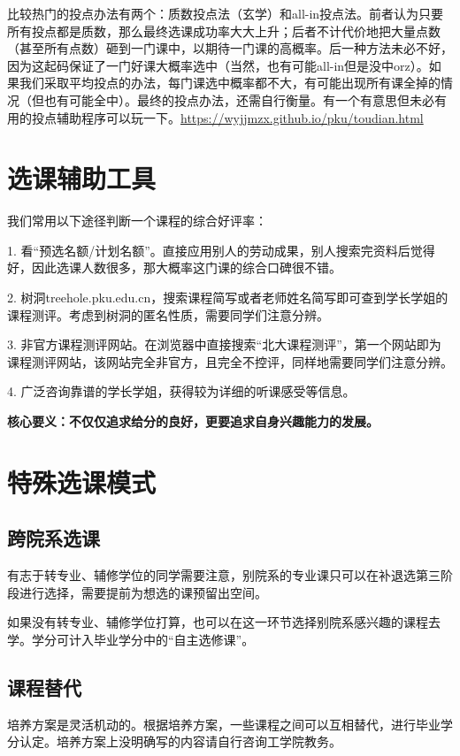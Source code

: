 \documentclass[11pt,oneside]{book}
\begin{document}
比较热门的投点办法有两个：质数投点法（玄学）和all-in投点法。前者认为只要所有投点都是质数，那么最终选课成功率大大上升；后者不计代价地把大量点数（甚至所有点数）砸到一门课中，以期待一门课的高概率。后一种方法未必不好，因为这起码保证了一门好课大概率选中（当然，也有可能all-in但是没中orz）。如果我们采取平均投点的办法，每门课选中概率都不大，有可能出现所有课全掉的情况（但也有可能全中）。最终的投点办法，还需自行衡量。有一个有意思但未必有用的投点辅助程序可以玩一下。\href{https://wyjjmzx.github.io/pku/toudian.html}{https://wyjjmzx.github.io/pku/toudian.html}


\section{选课辅助工具}
我们常用以下途径判断一个课程的综合好评率：

1. 看“预选名额/计划名额”。直接应用别人的劳动成果，别人搜索完资料后觉得好，因此选课人数很多，那大概率这门课的综合口碑很不错。

2. 树洞treehole.pku.edu.cn，搜索课程简写或者老师姓名简写即可查到学长学姐的课程测评。考虑到树洞的匿名性质，需要同学们注意分辨。

3. 非官方课程测评网站。在浏览器中直接搜索“北大课程测评”，第一个网站即为课程测评网站，该网站完全非官方，且完全不控评，同样地需要同学们注意分辨。

4. 广泛咨询靠谱的学长学姐，获得较为详细的听课感受等信息。

\textbf{核心要义：不仅仅追求给分的良好，更要追求自身兴趣能力的发展。}

\section{特殊选课模式}
\subsection{跨院系选课}
有志于转专业、辅修学位的同学需要注意，别院系的专业课只可以在补退选第三阶段进行选择，需要提前为想选的课预留出空间。

如果没有转专业、辅修学位打算，也可以在这一环节选择别院系感兴趣的课程去学。学分可计入毕业学分中的“自主选修课”。

\subsection{课程替代}
培养方案是灵活机动的。根据培养方案，一些课程之间可以互相替代，进行毕业学分认定。培养方案上没明确写的内容请自行咨询工学院教务。
\end{document}
